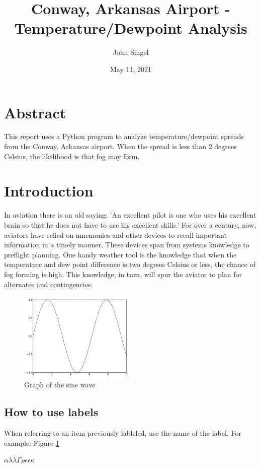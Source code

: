 \documentclass{article}
\title{Conway, Arkansas Airport - Temperature/Dewpoint Analysis}
\author{John Singel}\date{May 11, 2021}
\begin{document}
\maketitle

\section{Abstract}
This report uses a Python program to analyze temperature/dewpoint spreads from the Conway, Arkansas airport. When the spread is less than 2 degrees Celsius, the likelihood is that fog may form.

\section{Introduction}
In aviation there is an old saying: 'An excellent pilot is one who uses his excellent brain so that he does not have to use his excellent skills.' For over a century, now, aviators have relied on mnemonics and other devices to recall important information in a timely manner. These devices span from systems knowledge to preflight planning. One handy weather tool is the knowledge that when the temperature and dew point difference is two degrees Celsius or less, the chance of fog forming is high. This knowledge, in turn, will spur the aviator to plan for alternates and contingencies.

\begin{figure}[h]
\begin{center}
\includegraphics[width=0.5\textwidth]{fig3-1.png}
\end{center}
\caption{Graph of the sine wave}
\label{fig: 3-1}
\end{figure}

\subsection{How to use labels}
When referring to an item previously lableled, use the name of the label. For example: Figure  \ref{fig: 3-1}

$\alpha\lambda\lambda  \Gamma\rho\epsilon\epsilon\kappa$
\end{document}
